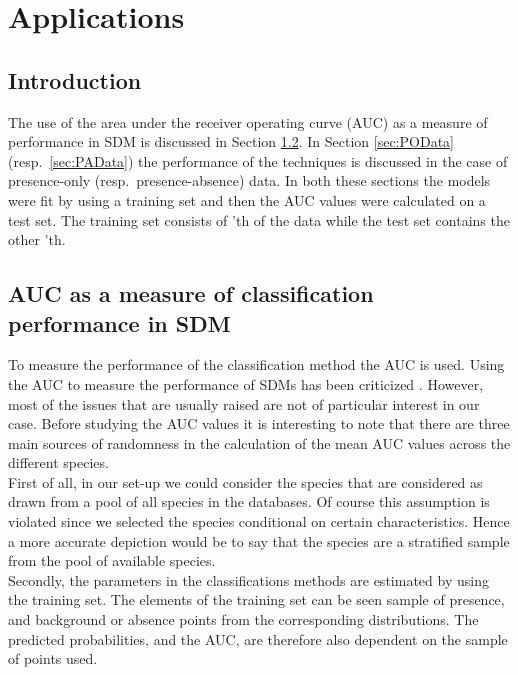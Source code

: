 \chapter{Applications}
\label{ch:Applications}
\section{Introduction}
The use of the area under the receiver operating curve (AUC) as a measure of performance in SDM is discussed in Section \ref{sec:AUC}. In Section \ref{sec:POData} (resp.\ \ref{sec:PAData}) the performance of the techniques is discussed in the case of presence-only (resp.\ presence-absence) data. In both these sections the models were fit by using a training set and then the AUC values were calculated on a test set. The training set consists of 'th of the data while the test set contains the other 'th.\\


\section{AUC as a measure of classification performance in SDM}
\label{sec:AUC}
To measure the performance of the classification method the AUC is used. Using the AUC to measure the performance of SDMs has been criticized \parencite{lobo_auc:_2008, jimenez-valverde_insights_2012}. However, most of the issues that are usually raised are not of particular interest in our case. Before studying the AUC values it is interesting to note that there are three main sources of randomness in the calculation of the mean AUC values across the different species. \\ 

First of all, in our set-up we could consider the species that are considered as drawn from a pool of all species in the databases. Of course this assumption is violated since we selected the species conditional on certain characteristics. Hence a more accurate depiction would be to say that the species are a stratified sample from the pool of available species.  \\

Secondly, the parameters in the classifications methods are estimated by using the training set. The elements of the training set can be seen sample of presence, and background or absence points from the corresponding distributions. The predicted probabilities, and the AUC, are therefore also dependent on the sample of points used.\\


